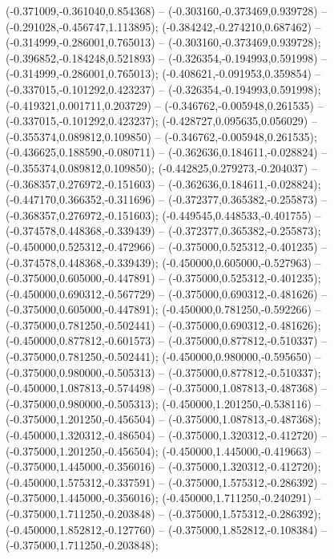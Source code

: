  (-0.371009,-0.361040,0.854368) -- (-0.303160,-0.373469,0.939728) -- (-0.291028,-0.456747,1.113895);
 (-0.384242,-0.274210,0.687462) -- (-0.314999,-0.286001,0.765013) -- (-0.303160,-0.373469,0.939728);
 (-0.396852,-0.184248,0.521893) -- (-0.326354,-0.194993,0.591998) -- (-0.314999,-0.286001,0.765013);
 (-0.408621,-0.091953,0.359854) -- (-0.337015,-0.101292,0.423237) -- (-0.326354,-0.194993,0.591998);
 (-0.419321,0.001711,0.203729) -- (-0.346762,-0.005948,0.261535) -- (-0.337015,-0.101292,0.423237);
 (-0.428727,0.095635,0.056029) -- (-0.355374,0.089812,0.109850) -- (-0.346762,-0.005948,0.261535);
 (-0.436625,0.188590,-0.080711) -- (-0.362636,0.184611,-0.028824) -- (-0.355374,0.089812,0.109850);
 (-0.442825,0.279273,-0.204037) -- (-0.368357,0.276972,-0.151603) -- (-0.362636,0.184611,-0.028824);
 (-0.447170,0.366352,-0.311696) -- (-0.372377,0.365382,-0.255873) -- (-0.368357,0.276972,-0.151603);
 (-0.449545,0.448533,-0.401755) -- (-0.374578,0.448368,-0.339439) -- (-0.372377,0.365382,-0.255873);
 (-0.450000,0.525312,-0.472966) -- (-0.375000,0.525312,-0.401235) -- (-0.374578,0.448368,-0.339439);
 (-0.450000,0.605000,-0.527963) -- (-0.375000,0.605000,-0.447891) -- (-0.375000,0.525312,-0.401235);
 (-0.450000,0.690312,-0.567729) -- (-0.375000,0.690312,-0.481626) -- (-0.375000,0.605000,-0.447891);
 (-0.450000,0.781250,-0.592266) -- (-0.375000,0.781250,-0.502441) -- (-0.375000,0.690312,-0.481626);
 (-0.450000,0.877812,-0.601573) -- (-0.375000,0.877812,-0.510337) -- (-0.375000,0.781250,-0.502441);
 (-0.450000,0.980000,-0.595650) -- (-0.375000,0.980000,-0.505313) -- (-0.375000,0.877812,-0.510337);
 (-0.450000,1.087813,-0.574498) -- (-0.375000,1.087813,-0.487368) -- (-0.375000,0.980000,-0.505313);
 (-0.450000,1.201250,-0.538116) -- (-0.375000,1.201250,-0.456504) -- (-0.375000,1.087813,-0.487368);
 (-0.450000,1.320312,-0.486504) -- (-0.375000,1.320312,-0.412720) -- (-0.375000,1.201250,-0.456504);
 (-0.450000,1.445000,-0.419663) -- (-0.375000,1.445000,-0.356016) -- (-0.375000,1.320312,-0.412720);
 (-0.450000,1.575312,-0.337591) -- (-0.375000,1.575312,-0.286392) -- (-0.375000,1.445000,-0.356016);
 (-0.450000,1.711250,-0.240291) -- (-0.375000,1.711250,-0.203848) -- (-0.375000,1.575312,-0.286392);
 (-0.450000,1.852812,-0.127760) -- (-0.375000,1.852812,-0.108384) -- (-0.375000,1.711250,-0.203848);
